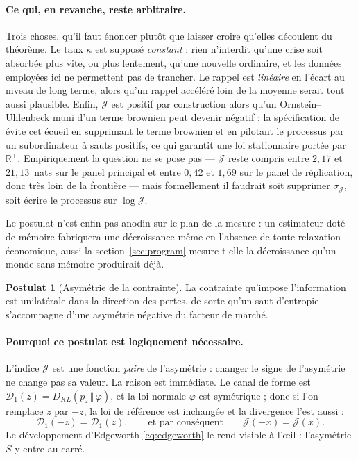 \documentclass[11pt]{article}
\theoremstyle{definition}
\newtheorem{postulate}{Postulat}
\theoremstyle{remark}
\newcommand{\JJ}{\mathcal{J}}
\newcommand{\Dun}{\mathcal{D}_1}
\newcommand{\KL}[2]{D_{KL}\!\left(#1\,\Vert\,#2\right)}
\begin{document}
\paragraph{Ce qui, en revanche, reste arbitraire.} Trois choses, qu'il faut
énoncer plutôt que laisser croire qu'elles découlent du théorème. Le taux
$\kappa$ est supposé \emph{constant} : rien n'interdit qu'une crise soit
absorbée plus vite, ou plus lentement, qu'une nouvelle ordinaire, et les données
employées ici ne permettent pas de trancher. Le rappel est \emph{linéaire} en
l'écart au niveau de long terme, alors qu'un rappel accéléré loin de la moyenne
serait tout aussi plausible. Enfin, $\JJ$ est positif par construction alors
qu'un Ornstein--Uhlenbeck muni d'un terme brownien peut devenir négatif : la
spécification de \citet{bns2001} évite cet écueil en supprimant le terme
brownien et en pilotant le processus par un subordinateur à sauts positifs, ce
qui garantit une loi stationnaire portée par $\mathbb{R}^+$. Empiriquement la
question ne se pose pas --- $\JJ$ reste compris entre $2{,}17$ et $21{,}13$~nats
sur le panel principal et entre $0{,}42$ et $1{,}69$ sur le panel de
réplication, donc très loin de la frontière --- mais formellement il faudrait
soit supprimer $\sigma_\JJ$, soit écrire le processus sur $\log\JJ$.

Le postulat n'est enfin pas anodin sur le plan de la mesure : un estimateur doté
de mémoire fabriquera une décroissance même en l'absence de toute relaxation
économique, aussi la section~\ref{sec:program} mesure-t-elle la décroissance
qu'un monde sans mémoire produirait déjà.

\begin{postulate}[Asymétrie de la contrainte]
\label{p:sign}
La contrainte qu'impose l'information est unilatérale dans la direction des
pertes, de sorte qu'un saut d'entropie s'accompagne d'une asymétrie négative du
facteur de marché.
\end{postulate}

\paragraph{Pourquoi ce postulat est logiquement nécessaire.} L'indice $\JJ$ est
une fonction \emph{paire} de l'asymétrie : changer le signe de l'asymétrie ne
change pas sa valeur. La raison est immédiate. Le canal de forme est
$\Dun(z)=\KL{p_z}{\varphi}$, et la loi normale $\varphi$ est symétrique ; donc
si l'on remplace $z$ par $-z$, la loi de référence est inchangée et la
divergence l'est aussi :
\begin{equation}
\label{eq:even}
\Dun(-z)=\Dun(z),\qquad\text{et par conséquent}\qquad \JJ(-x)=\JJ(x).
\end{equation}
Le développement d'Edgeworth \eqref{eq:edgeworth} le rend visible à l'\oe il :
l'asymétrie $S$ y entre au carré.
\end{document}
